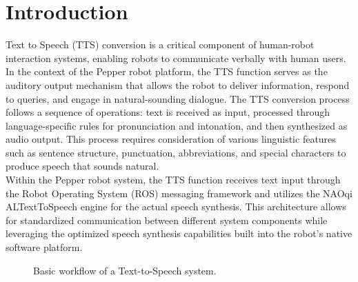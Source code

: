 \documentclass{CSSRforAfrica}
\begin{document}
\label{executive_summary}
 

\newpage
 
 
\pagebreak
\tableofcontents
\newpage


\section{Introduction}
Text to Speech (TTS) conversion is a critical component of human-robot interaction systems, enabling robots to communicate verbally with human users. In the context of the Pepper robot platform, the TTS function serves as the auditory output mechanism that allows the robot to deliver information, respond to queries, and engage in natural-sounding dialogue.
The TTS conversion process follows a sequence of operations: text is received as input, processed through language-specific rules for pronunciation and intonation, and then synthesized as audio output\cite{Zen2009}. This process requires consideration of various linguistic features such as sentence structure, punctuation, abbreviations, and special characters to produce speech that sounds natural. \\

Within the Pepper robot system, the TTS function receives text input through the Robot Operating System (ROS) messaging framework and utilizes the NAOqi ALTextToSpeech engine for the actual speech synthesis. This architecture allows for standardized communication between different system components while leveraging the optimized speech synthesis capabilities built into the robot's native software platform.

\begin{figure}[h]
    \centering
    \caption{Basic workflow of a Text-to-Speech system.}
    \label{fig:tts-workflow}
\end{figure}
\end{document}
